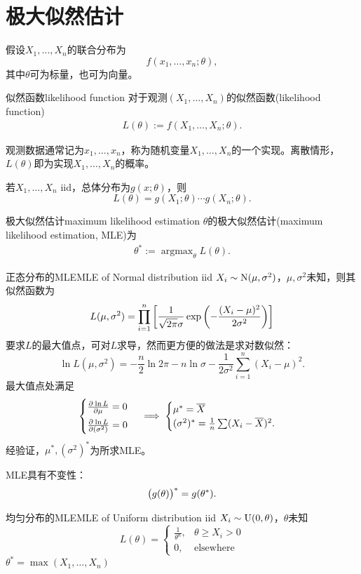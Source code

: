 \section{极大似然估计}
假设$X_1,\ldots,X_n$的联合分布为 
\[
	f(x_1,\ldots,x_n;\theta),
\]
其中$\theta$可为标量，也可为向量。
\begin{definition}{似然函数}{likelihood function}
	对于观测$(X_1,\ldots,X_n)$的似然函数(likelihood function)
	\begin{align}
		L(\theta):=f(X_1,\ldots,X_n;\theta).
	\end{align}
\end{definition}
观测数据通常记为$x_1,\ldots,x_n$，称为随机变量$X_1,\ldots,X_n$的一个实现。离散情形，$L(\theta)$即为实现$X_1,\ldots,X_n$的概率。

若$X_1,\ldots,X_n$ iid，总体分布为$g(x;\theta)$，则
\[
	L(\theta)=g(X_1;\theta)\cdots g(X_n;\theta).
\]
\begin{definition}{极大似然估计}{maximum likelihood estimation}
	$\theta$的极大似然估计(maximum likelihood estimation, MLE)为
	\begin{align}
		\theta^\ast:=\mathop{\arg\max}_\theta L(\theta).
	\end{align}
\end{definition}
\begin{example}{正态分布的MLE}{MLE of Normal distribution}
	iid $X_i\sim\operatorname{N}(\mu,\sigma^2)$，$\mu,\sigma^2$未知，则其似然函数为
	\[
		L(\mu,\sigma^2)=\prod_{i=1}^n\left[\frac1{\sqrt{2\pi}\sigma}\exp\left(-\frac{(X_i-\mu)^2}{2\sigma^2}\right)\right]
	\]
	要求$L$的最大值点，可对$L$求导，然而更方便的做法是求对数似然：
	\[
		\ln L(\mu,\sigma^2)=-\frac n2\ln2\pi-n\ln\sigma-\frac1{2\sigma^2}\sum_{i=1}^n(X_i-\mu)^2.
	\]
	最大值点处满足
	\[
		\begin{cases}
			\frac{\partial^{{}}\ln L}{\partial{\mu}^{{}}}=0\\[1ex]
			\frac{\partial^{{}}\ln L}{\partial{(\sigma^2)}^{{}}}=0
		\end{cases}\implies
		\begin{cases}
			\mu^\ast=\overline{X}\\
			(\sigma^2)^\ast=\frac1n\sum(X_i-\overline{X})^2.
		\end{cases}
	\]
	经验证，$\mu^\ast,(\sigma^2)^\ast$为所求MLE。
\end{example}
\begin{remark}
	MLE具有不变性：
	\begin{align}
		\bigl(g(\theta)\bigr)^\ast=g(\theta^\ast).
	\end{align}
\end{remark}
\begin{example}{均匀分布的MLE}{MLE of Uniform distribution}
	iid $X_i\sim\operatorname{U}(0,\theta)$，$\theta$未知
	\[
		L(\theta)=\begin{cases}
			\frac1{\theta^n},&\theta\geqslant X_i>0\\
			0,&\text{elsewhere}
		\end{cases}
	\]
	$\theta^\ast=\max(X_1,\ldots,X_n)$
\end{example}
